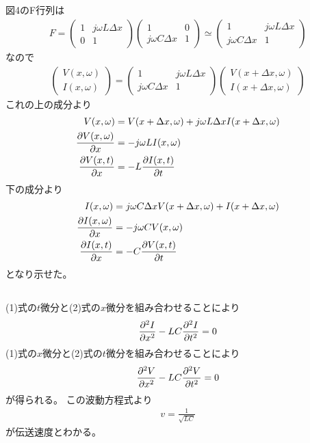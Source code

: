 \documentclass[../../master.tex]{subfiles}
\begin{document}
\subsection{}
図4のF行列は
\begin{align}
    F = \begin{pmatrix}
        1 & j\omega L\Delta x\\
        0 & 1
    \end{pmatrix}\begin{pmatrix}
        1 & 0\\
        j\omega C \Delta x& 1
    \end{pmatrix}
    \simeq\begin{pmatrix}
        1 & j\omega L \Delta x\\
        j\omega C  \Delta x& 1
    \end{pmatrix}
\end{align}
なので
\begin{align}
    \begin{pmatrix}
        V(x,\omega)\\I(x,\omega)
    \end{pmatrix}=
    \begin{pmatrix}
        1 & j\omega L \Delta x\\
        j\omega C  \Delta x& 1
    \end{pmatrix}\begin{pmatrix}
        V(x+\Delta x,\omega)\\
        I(x+\Delta x,\omega)
    \end{pmatrix}
\end{align}
これの上の成分より
\begin{align}
    V(x,\omega)&= V(x+\Delta x,\omega)+j\omega L\Delta x I(x+\Delta x,\omega)\\
    \pdv{V(x,\omega)}{x} &= -j\omega L I(x,\omega)\\
    \pdv{V(x,t)}{x} &= - L \pdv{I(x,t)}{t}
\end{align}
下の成分より
\begin{align}
    I(x,\omega) &= j\omega C \Delta x V(x+\Delta x,\omega) + I(x+\Delta x,\omega)\\
    \pdv{I(x,\omega)}{x} &= -j\omega C V(x,\omega)\\
    \pdv{I(x,t)}{x} &= - C \pdv{V(x,t)}{t}\\
\end{align}
となり示せた。

\subsection{}
(1)式の\(t\)微分と(2)式の\(x\)微分を組み合わせることにより
\begin{align}
    \pdv[2]{I}{x}-LC\pdv[2]{I}{t}=0
\end{align}
(1)式の\(x\)微分と(2)式の\(t\)微分を組み合わせることにより
\begin{align}
    \pdv[2]{V}{x}-LC\pdv[2]{V}{t}=0
\end{align}
が得られる。
この波動方程式より
\begin{align}
    v = \frac{1}{\sqrt{LC}}
\end{align}
が伝送速度とわかる。
\end{document}
